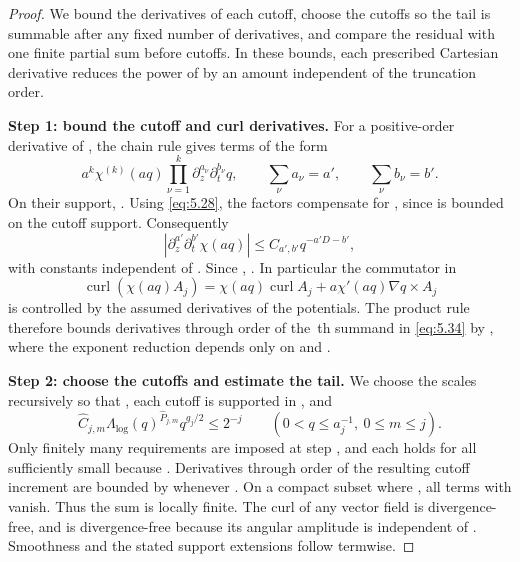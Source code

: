 \begin{proof}
We bound the derivatives of each cutoff, choose the cutoffs so the tail is summable after any fixed
number of derivatives, and compare the residual with one finite partial sum before cutoffs. In these
bounds, each prescribed Cartesian derivative reduces the power of  by an
amount independent of the truncation order.

\textbf{Step 1: bound the cutoff and curl derivatives.}
For a positive-order derivative of , the chain rule gives terms of the
form
\[
 a^k\chi^{(k)}(aq)\prod_{\nu=1}^{k}\partial_z^{a_\nu}\partial_t^{b_\nu}q,
 \qquad
 \sum_\nu a_\nu=a',
 \qquad
 \sum_\nu b_\nu=b'.
\]
On their support, . Using \eqref{eq:5.28}, the factors
 compensate for , since
 is bounded on the cutoff support. Consequently
\[
 |\partial_z^{a'}\partial_t^{b'}\chi(aq)|
 \leq C_{a',b'}q^{-a'D-b'},
\]
with constants independent of . Since
,
. In particular the commutator in
\[
 \operatorname{curl}(\chi(aq)A_j)
 =\chi(aq)\operatorname{curl}A_j+a\chi'(aq)\nabla q\times A_j
\]
is controlled by the assumed derivatives of the potentials. The product rule therefore bounds
derivatives through order  of the \,th summand in
\eqref{eq:5.34} by
, where
the exponent reduction  depends only on
 and .

\textbf{Step 2: choose the cutoffs and estimate the tail.}
We choose the scales  recursively so that
, each cutoff  is supported in
, and
\begin{equation}
 \widehat C_{j,m}\Lambda_{\log}(q)^{\widehat P_{j,m}}q^{g_j/2}
 \leq2^{-j}
 \qquad(0<q\leq a_j^{-1},\ 0\leq m\leq j).
 \tag{5.37}\label{eq:5.37}
\end{equation}
Only finitely many requirements are imposed at step , and each holds for all
sufficiently small  because . Derivatives through
order  of the resulting cutoff increment are bounded by
 whenever . On a compact
subset where , all terms with
 vanish. Thus the sum is locally finite. The curl of any vector
field is divergence-free, and  is divergence-free because its
angular amplitude is independent of . Smoothness and the stated support
extensions follow termwise.


\end{proof}
